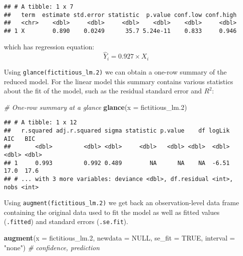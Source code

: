 \documentclass[
]{book}
\newenvironment{Shaded}{\begin{snugshade}}{\end{snugshade}}
\newcommand{\CommentTok}[1]{\textcolor[rgb]{0.56,0.35,0.01}{\textit{#1}}}
\newcommand{\DataTypeTok}[1]{\textcolor[rgb]{0.13,0.29,0.53}{#1}}
\newcommand{\FloatTok}[1]{\textcolor[rgb]{0.00,0.00,0.81}{#1}}
\newcommand{\KeywordTok}[1]{\textcolor[rgb]{0.13,0.29,0.53}{\textbf{#1}}}
\newcommand{\NormalTok}[1]{#1}
\newcommand{\OtherTok}[1]{\textcolor[rgb]{0.56,0.35,0.01}{#1}}
\newcommand{\StringTok}[1]{\textcolor[rgb]{0.31,0.60,0.02}{#1}}
\begin{document}
\begin{verbatim}
## # A tibble: 1 x 7
##   term  estimate std.error statistic  p.value conf.low conf.high
##   <chr>    <dbl>     <dbl>     <dbl>    <dbl>    <dbl>     <dbl>
## 1 X        0.890    0.0249      35.7 5.24e-11    0.833     0.946
\end{verbatim}

which has regression equation:
\[
\hat Y_i=0.927\times X_i
\]

Using \texttt{glance(fictitious\_lm.2)} we can obtain a one-row summary of the reduced model. For the linear model this summary contains various statistics about the fit of the model, such as the residual standard error and \(R^2\):

\begin{Shaded}
\begin{Highlighting}[]
\CommentTok{# One-row summary at a glance}
\KeywordTok{glance}\NormalTok{(}\DataTypeTok{x =}\NormalTok{ fictitious_lm}\FloatTok{.2}\NormalTok{)}
\end{Highlighting}
\end{Shaded}

\begin{verbatim}
## # A tibble: 1 x 12
##   r.squared adj.r.squared sigma statistic p.value    df logLik   AIC   BIC
##       <dbl>         <dbl> <dbl>     <dbl>   <dbl> <dbl>  <dbl> <dbl> <dbl>
## 1     0.993         0.992 0.489        NA      NA    NA  -6.51  17.0  17.6
## # ... with 3 more variables: deviance <dbl>, df.residual <int>, nobs <int>
\end{verbatim}

Using \texttt{augment(fictitious\_lm.2)} we get back an observation-level data frame containing the original data used to fit the model as well as fitted values (\texttt{.fitted}) and standard errors (\texttt{.se.fit}).

\begin{Shaded}
\begin{Highlighting}[]
\KeywordTok{augment}\NormalTok{(}\DataTypeTok{x =}\NormalTok{ fictitious_lm}\FloatTok{.2}\NormalTok{,}
        \DataTypeTok{newdata =} \OtherTok{NULL}\NormalTok{,}
        \DataTypeTok{se_fit =} \OtherTok{TRUE}\NormalTok{,}
        \DataTypeTok{interval =} \StringTok{"none"}\NormalTok{) }\CommentTok{# confidence, prediction}
\end{Highlighting}
\end{Shaded}
\end{document}
